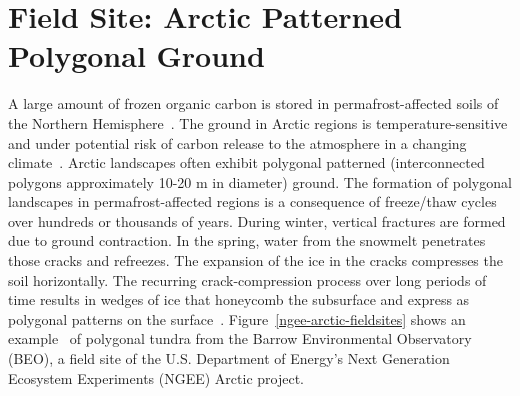 \documentclass[review,11pt]{elsarticle}
\begin{document}
\section{Field Site: Arctic Patterned Polygonal Ground}\label{field-site}
A large amount of frozen organic carbon is stored in permafrost-affected soils of the Northern Hemisphere~\cite{schuur2015climate,bg-11-6573-2014}.
The ground in Arctic regions is temperature-sensitive and under potential risk of carbon release to the atmosphere in a changing climate~\cite{hinzman2005evidence}.
Arctic landscapes often exhibit polygonal patterned (interconnected polygons approximately 10-20 m in diameter) ground.
The formation of polygonal landscapes in permafrost-affected regions is a consequence of freeze/thaw cycles over hundreds or thousands of years.
During winter, vertical fractures are formed due to ground contraction. In the spring, water from the snowmelt penetrates those cracks and refreezes.
The expansion of the ice in the cracks compresses the soil horizontally.
The recurring crack-compression process over long periods of time results in wedges of ice that honeycomb the subsurface and express as polygonal patterns on the surface~\cite{lachenbruch1962mechanics,greene1963contraction,mackay1990some,mackay2004thermally}.
Figure~\ref{ngee-arctic-fieldsites} shows an example~\cite{kumar2016modeling} of polygonal tundra from the Barrow Environmental Observatory (BEO), a field site of the U.S. Department of Energy's Next Generation Ecosystem Experiments (NGEE) Arctic project.
%
\end{document}
